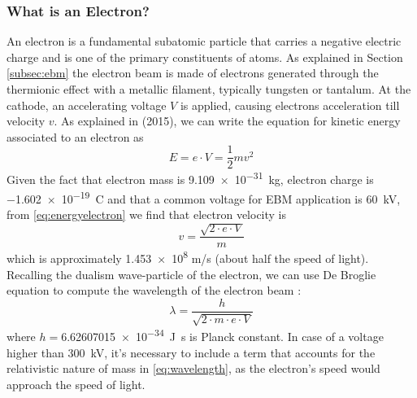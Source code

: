 \subsubsection{What is an Electron?}
\label{sssec:electron}
An electron is a fundamental subatomic particle that carries a negative electric charge and is one of the primary constituents of atoms. As explained in Section \ref{subsec:ebm} the electron beam is made of electrons generated through the thermionic effect with a metallic filament, typically tungsten or tantalum. At the cathode, an accelerating voltage $V$ is applied, causing electrons acceleration till velocity $v$. As explained in \citeauthor{krumeich_properties_2015} (2015), we can write the equation for kinetic energy associated to an electron as 
\begin{equation}
    \label{eq:energyelectron}
    E  = e\cdot V = \frac{1}{2}mv^2
\end{equation}
Given the fact that electron mass is \SI{9.109e-31}{\kilo\gram}, electron charge is \SI{-1.602e-19}{\coulomb} and that a common voltage for EBM application is \SI{60}{\kilo\volt}, from \ref{eq:energyelectron} we find that electron velocity is
\begin{equation}
\label{eq:velocityelectron}
v=\frac{\sqrt{2\cdot e\cdot V}}{m}
\end{equation}
which is approximately \num{1.453e8} \unit{m/s} (about half the speed of light). Recalling the dualism wave-particle of the electron, we can use De Broglie equation to compute the wavelength of the electron beam \cite{krumeich_properties_2015}:
\begin{equation}
\label{eq:wavelength}
    \lambda = \frac{h}{\sqrt{2\cdot m \cdot e \cdot V}}
\end{equation}
where $h=$\SI{6.62607015e-34}{\joule.\second} is Planck constant. In case of a voltage higher than \SI{300}{\kilo\volt}, it's necessary to include a term that accounts for the relativistic nature of mass in \ref{eq:wavelength}, as the electron's speed would approach the speed of light.
